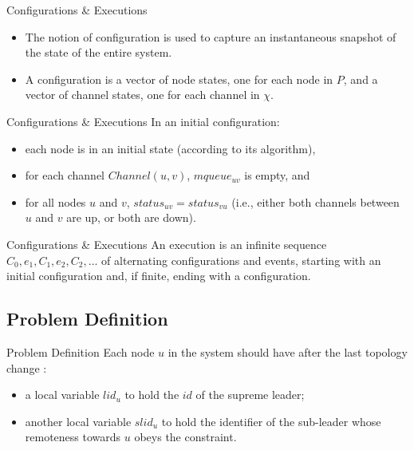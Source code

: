 \documentclass{beamer}
\begin{document}
\begin{frame}{Configurations \& Executions}

\begin{itemize}
	\item The notion of configuration is used to capture an instantaneous snapshot of the state of the entire system.
	\item A configuration is a vector of node states, one for each node in $P$, and a vector of channel states, one for each channel in $\chi$.
\end{itemize}

\end{frame}

\begin{frame}{Configurations \& Executions}
In an initial configuration:
\begin{itemize}
	\item each node is in an initial state (according to its algorithm), \item for each channel $Channel(u, v)$, $mqueue_{uv}$ is empty, and \item for all nodes $u$ and $v$, $status_{uv} = status_{vu}$ (i.e., either both channels between $u$ and $v$ are up, or both are down).
\end{itemize}
\end{frame}

\begin{frame}{Configurations \& Executions}
	An execution is an infinite sequence $C_0, e_1 ,C_1, e_2, C_2 , ...$ of alternating configurations and events, starting with an initial configuration and, if finite, ending with a configuration.
\end{frame}


\subsection{Problem Definition}
\begin{frame}{Problem Definition}
Each node $u$ in the system should have after the last topology change :
\begin{itemize}
	\item a local variable $lid_{u}$ to hold the $id$ of the supreme leader;
	\item another local variable $slid_u$ to hold the identifier of the sub-leader whose remoteness towards $u$ obeys the constraint.
\end{itemize}
\end{frame}
\end{document}
